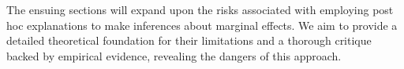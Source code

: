 \documentclass[mnsc,blindrev]{informs3}
\begin{document}
The ensuing sections will expand upon the risks associated with employing post hoc explanations to make inferences about marginal effects. We aim to provide a detailed theoretical foundation for their limitations and a thorough critique backed by empirical evidence, revealing the dangers of this approach.


     
\end{document}
